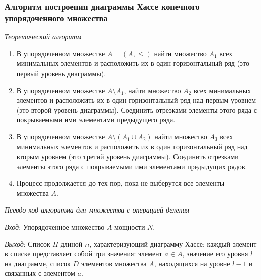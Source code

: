 \documentclass[bachelor, och, labwork]{shiza}
\begin{document}
\subsubsection{Алгоритм построения диаграммы Хассе конечного упорядоченного множества}

\begin{center}\textit{Теоретический алгоритм}\end{center}
\begin{enumerate}
    \item В упорядоченном множестве $A = (A, \leq)$ найти множество $A_1$ всех минимальных элементов и расположить их в один горизонтальный ряд (это первый уровень диаграммы).
    \item В упорядоченном множестве $A \setminus A_1$, найти множество $A_2$ всех минимальных элементов и
    расположить их в один горизонтальный ряд над первым уровнем (это второй уровень диаграммы). Соединить
    отрезками элементы этого ряда с покрываемыми ими элементами предыдущего ряда.
    \item В упорядоченном множестве $A \setminus (A_1 \cup A_2)$ найти множество $A_3$ всех минимальных
    элементов и расположить их в один горизонтальный ряд над вторым уровнем (это третий уровень диаграммы).
    Соединить отрезками элементы этого ряда с покрываемыми ими элементами предыдущих рядов.
    \item Процесс продолжается до тех пор, пока не выберутся все элементы множества $A$.
\end{enumerate}

\begin{center}\textit{Псевдо-код алгоритма для множества с операцией деления}\end{center}

\textit{Вход}: Упорядоченное множество $A$ мощности $N$.

\textit{Выход}: Список $H$ длиной $n$, характеризующий диаграмму Хассе: каждый 
элемент в списке представляет собой три значения: элемент $a \in A$, значение его 
уровня $l$ на диаграмме, список $D$ элементов множества $A$, находящихся на 
уровне $l - 1$ и связанных с элементом $a$.
\end{document}
